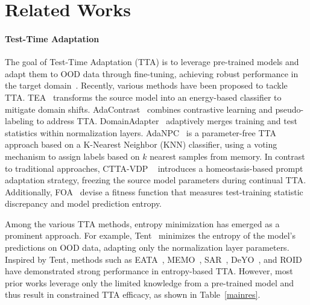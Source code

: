 \vspace{-0.11in}
\section{Related Works}
\vspace{-0.03in}

\paragraph{Test-Time Adaptation} The goal of Test-Time Adaptation (TTA) is to leverage pre-trained models and adapt them to OOD data through fine-tuning, achieving robust performance in the target domain~\cite{liang2024comprehensive}. Recently, various methods have been proposed to tackle TTA. TEA~\cite{yuan2024tea} transforms the source model into an energy-based classifier to mitigate domain shifts. AdaContrast~\cite{chen2022contrastive} combines contrastive learning and pseudo-labeling to address TTA. DomainAdapter~\cite{zhang2023domain} adaptively merges training and test statistics within normalization layers. AdaNPC~\cite{zhang2023adanpc} is a parameter-free TTA approach based on a K-Nearest Neighbor (KNN) classifier, using a voting mechanism to assign labels based on $k$ nearest samples from memory. In contrast to traditional approaches, CTTA-VDP ~\cite{gan2023decorate} introduces a homeostasis-based prompt adaptation strategy, freezing the source model parameters during continual TTA. Additionally, FOA~\cite{niu2024test} devise a fitness function that measures test-training statistic discrepancy and model prediction entropy. 

Among the various TTA methods, entropy minimization has emerged as a prominent approach. For example, Tent~\cite{wang2020tent} minimizes the entropy of the model’s predictions on OOD data, adapting only the normalization layer parameters. Inspired by Tent, methods such as EATA~\cite{niu2022efficient}, MEMO~\cite{zhang2022memo}, SAR~\cite{niu2023towards}, DeYO~\cite{lee2024entropy}, and ROID~\cite{marsden2024universal2} have demonstrated strong performance in entropy-based TTA. However, most prior works leverage only the limited knowledge from a pre-trained model and thus result in constrained TTA efficacy, as shown in Table~\ref{mainres}.

